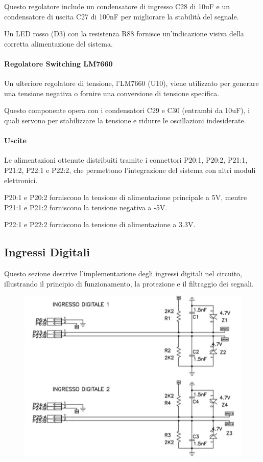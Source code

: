 \documentclass[12pt,a4paper]{report}
\begin{document}
Questo regolatore include un condensatore di ingresso C28 di 10uF e 
un condensatore di uscita C27 di 100nF per migliorare la stabilità del segnale.

Un LED rosso (D3) con la resistenza R88 fornisce un'indicazione visiva della corretta alimentazione del sistema.

\paragraph{Regolatore Switching LM7660}
Un ulteriore regolatore di tensione, l'LM7660 (U10), 
viene utilizzato per generare una tensione negativa o fornire una conversione di tensione specifica. 

Questo componente opera con i condensatori C29 e C30 (entrambi da 10uF), i quali servono per stabilizzare la tensione e ridurre le oscillazioni indesiderate.

\paragraph{Uscite}
Le alimentazioni ottenute distribuiti tramite i connettori P20:1, P20:2, P21:1, P21:2, P22:1 e P22:2, 
che permettono l'integrazione del sistema con altri moduli elettronici.

P20:1 e P20:2 forniscono la tensione di alimentazione principale a 5V, mentre P21:1 e P21:2 forniscono la tensione negativa a -5V.

P22:1 e P22:2 forniscono la tensione di alimentazione a 3.3V.

\newpage

\subsection{Ingressi Digitali}

Questo sezione descrive l'implementazione degli ingressi digitali nel circuito, illustrando il principio di funzionamento, la protezione e il filtraggio dei segnali.
\begin{figure}[H]
    \centering
    \includegraphics[width=\linewidth]{../image/IngressiDigitali.png}
    \caption{ }
\end{figure}
\end{document}
